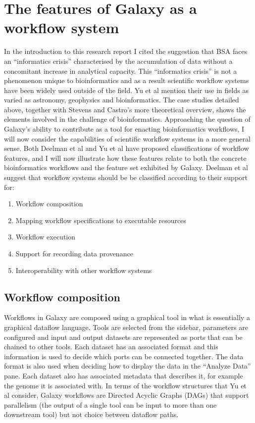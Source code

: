 \documentclass[a4paper,10pt]{scrreprt}
\begin{document}
\section{The features of Galaxy as a workflow system}

In the introduction to this research report I cited the suggestion that \gls{BSA} faces an ``informatics crisis'' characterised by the accumulation of data without a concomitant increase in analytical capacity. This ``informatics crisis'' is not a phenomenon unique to bioinformatics and as a result scientific workflow systems have been widely used outside of the field. Yu et al mention their use in fields as varied as astronomy, geophysics and bioinformatics. \cite{yu_taxonomy_2005} The case studies detailed above, together with Stevens and Castro's more theoretical overview, shows the elements involved in the challenge of bioinformatics. Approaching the question of Galaxy's ability to contribute as a tool for enacting bioinformatics workflows, I will now consider the capabilities of scientific workflow systems in a more general sense. Both Deelman et al \cite{deelman_workflows_2009} and Yu et al \cite{yu_taxonomy_2005} have proposed classifications of workflow features, and I will now illustrate how these 
features relate to both the concrete bioinformatics workflows and the feature set exhibited by Galaxy. Deelman et al suggest that workflow systems should be be classified according to their support for:

\begin{enumerate}
\item Workflow composition
\item Mapping workflow specifications to executable resources
\item Workflow execution
\item Support for recording data provenance
\item Interoperability with other workflow systems
\end{enumerate}


\subsection{Workflow composition}

Workflows in Galaxy are composed using a graphical tool in what is essentially a graphical dataflow language. Tools are selected from the sidebar, parameters are configured and input and output datasets are represented as ports that can be chained to other tools. Each dataset has an associated format and this information is used to decide which ports can be connected together. The data format is also used when deciding how to display the data in the ``Analyze Data'' pane. Each dataset also has associated metadata that describes it, for example the genome it is associated with. In terms of the workflow structures that Yu et al \cite{yu_taxonomy_2005} consider, Galaxy workflows are Directed Acyclic Graphs (DAGs) that support parallelism (the output of a single tool can be input to more than one downstream tool) but not choice between dataflow paths.
\end{document}
